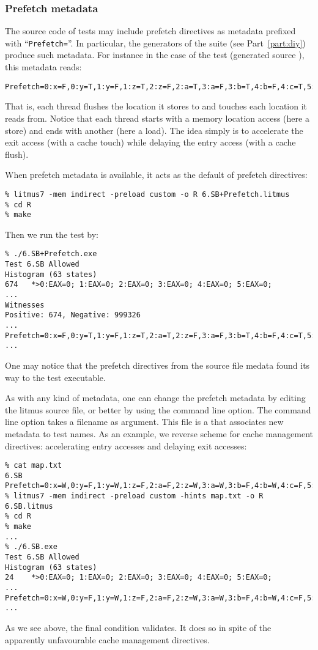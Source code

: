 \subsubsection{Prefetch metadata}
The source code of tests may include prefetch directives as metadata
prefixed with ``\verb+Prefetch=+''.
In particular, the generators of the \diy{}
suite  (see Part~\ref{part:diy}) produce such metadata.
For instance in the case of the
 test (generated source ),
this metadata reads:
\begin{verbatim}
Prefetch=0:x=F,0:y=T,1:y=F,1:z=T,2:z=F,2:a=T,3:a=F,3:b=T,4:b=F,4:c=T,5:c=F,5:x=T
\end{verbatim}
That is, each thread flushes the location it stores to and touches
each location it reads from.
Notice that each thread starts with a memory location access
(here a store) and ends with another (here a load).
The idea simply is to accelerate the exit access (with a cache touch)
while delaying the entry access (with a cache flush).


When prefetch metadata is available, it acts as the default of
prefetch directives:
\begin{verbatim}
% litmus7 -mem indirect -preload custom -o R 6.SB+Prefetch.litmus
% cd R
% make
\end{verbatim}
Then we run the test by:
\begin{verbatim}
% ./6.SB+Prefetch.exe
Test 6.SB Allowed
Histogram (63 states)
674   *>0:EAX=0; 1:EAX=0; 2:EAX=0; 3:EAX=0; 4:EAX=0; 5:EAX=0;
...
Witnesses
Positive: 674, Negative: 999326
...
Prefetch=0:x=F,0:y=T,1:y=F,1:z=T,2:a=T,2:z=F,3:a=F,3:b=T,4:b=F,4:c=T,5:c=F,5:x=T
...
\end{verbatim}
One may notice that the prefetch directives from the source file
medata found its way to the test executable.

As with any kind of metadata,
one can change the prefetch metadata by editing the litmus source file,
or better by using the  command line option.
The   command line option takes a filename as  argument.
This file is a  that associates
new metadata to test names.
As an example, we reverse \diy{} scheme for cache management directives:
accelerating entry accesses and delaying exit accesses:
\begin{verbatim}
% cat map.txt
6.SB Prefetch=0:x=W,0:y=F,1:y=W,1:z=F,2:a=F,2:z=W,3:a=W,3:b=F,4:b=W,4:c=F,5:c=W,5:x=F
% litmus7 -mem indirect -preload custom -hints map.txt -o R 6.SB.litmus
% cd R
% make 
...
% ./6.SB.exe 
Test 6.SB Allowed
Histogram (63 states)
24    *>0:EAX=0; 1:EAX=0; 2:EAX=0; 3:EAX=0; 4:EAX=0; 5:EAX=0;
...
Prefetch=0:x=W,0:y=F,1:y=W,1:z=F,2:a=F,2:z=W,3:a=W,3:b=F,4:b=W,4:c=F,5:c=W,5:x=F
...
\end{verbatim}
As we see above, the final condition validates.
It does so in spite of
the apparently unfavourable cache management directives.

